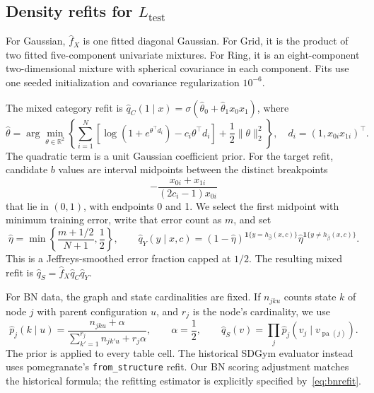 \documentclass[11pt,letterpaper]{article}
\newcommand{\ind}{\mathbf{1}}
\newcommand{\Ltest}{L_{\mathrm{test}}}
\begin{document}
\subsection{Density refits for \texorpdfstring{$\Ltest$}{L-test}}
For Gaussian, $\widehat f_X$ is one fitted diagonal Gaussian. For Grid, it is the product of two fitted five-component univariate mixtures. For Ring, it is an eight-component two-dimensional mixture with spherical covariance in each component. Fits use one seeded initialization and covariance regularization $10^{-6}$.

The mixed category refit is $\widehat q_C(1\mid x)=\sigma(\widehat\theta_0+\widehat\theta_1x_0x_1)$, where
\begin{equation}
 \widehat\theta=\arg\min_{\theta\in\mathbb{R}^2}
 \left\{\sum_{i=1}^{N}\left[\log(1+e^{\theta^\top d_i})-c_i\theta^\top d_i\right]
 +\frac12\|\theta\|_2^2\right\},\quad d_i=(1,x_{0i}x_{1i})^\top.
\end{equation}
The quadratic term is a unit Gaussian coefficient prior. For the target refit, candidate $b$ values are interval midpoints between the distinct breakpoints
\[
 -\frac{x_{0i}+x_{1i}}{(2c_i-1)x_{0i}}
\]
that lie in $(0,1)$, with endpoints 0 and 1. We select the first midpoint with minimum training error, write that error count as $m$, and set
\begin{equation}
 \widehat\eta=\min\left\{\frac{m+1/2}{N+1},\frac12\right\},\qquad
 \widehat q_Y(y\mid x,c)=
 (1-\widehat\eta)^{\ind\{y=h_{\widehat\beta}(x,c)\}}
 \widehat\eta^{\ind\{y\ne h_{\widehat\beta}(x,c)\}}.
\end{equation}
This is a Jeffreys-smoothed error fraction capped at $1/2$. The resulting mixed refit is $\widehat q_S=\widehat f_X\widehat q_C\widehat q_Y$.

For BN data, the graph and state cardinalities are fixed. If $n_{jku}$ counts state $k$ of node $j$ with parent configuration $u$, and $r_j$ is the node's cardinality, we use
\begin{equation}
 \widehat p_j(k\mid u)=\frac{n_{jku}+\alpha}{\sum_{k'=1}^{r_j}n_{jk'u}+r_j\alpha},
 \qquad\alpha=\frac12,
 \qquad\widehat q_S(v)=\prod_j\widehat p_j(v_j\mid v_{\operatorname{pa}(j)}).
 \label{eq:bnrefit}
\end{equation}
The prior is applied to every table cell. The historical SDGym evaluator instead uses pomegranate's \texttt{from\_structure} refit. Our BN scoring adjustment matches the historical formula; the refitting estimator is explicitly specified by~\eqref{eq:bnrefit}.
\end{document}
